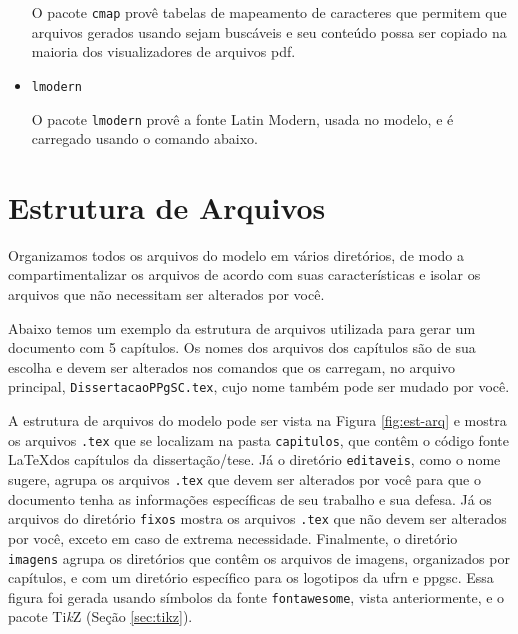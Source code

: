 \begin{itemize}
O pacote \texttt{cmap} provê tabelas de mapeamento de caracteres que permitem que arquivos gerados usando  sejam buscáveis e seu conteúdo possa ser copiado na maioria dos visualizadores de arquivos \gls{pdf}.


\item \texttt{lmodern}

O pacote \texttt{lmodern} provê a fonte Latin Modern, usada no modelo, e é carregado usando o comando abaixo.


\end{itemize}

\section{Estrutura de Arquivos}
Organizamos todos os arquivos do modelo em vários diretórios, de modo a compartimentalizar os arquivos de acordo com suas características e isolar os arquivos que não necessitam ser alterados por você.

Abaixo temos um exemplo da estrutura de arquivos utilizada para gerar um documento com 5 capítulos. Os nomes dos arquivos dos capítulos são de sua escolha e devem ser alterados nos comandos que os carregam, no arquivo principal, \texttt{DissertacaoPPgSC.tex}, cujo nome também pode ser mudado por você.

A estrutura de arquivos do modelo pode ser vista na Figura \ref{fig:est-arq} e mostra os arquivos \texttt{.tex} que se localizam na pasta \texttt{capitulos}, que contêm o código fonte \LaTeX dos capítulos da dissertação/tese. Já o diretório \texttt{editaveis}, como o nome sugere, agrupa os arquivos \texttt{.tex} que devem ser alterados por você para que o documento tenha as informações específicas de seu trabalho e sua defesa. Já os arquivos do diretório \texttt{fixos} mostra os arquivos \texttt{.tex} que não devem ser alterados por você, exceto em caso de extrema necessidade. Finalmente, o diretório  \texttt{imagens} agrupa os diretórios que contêm os arquivos de imagens, organizados por capítulos, e com um diretório específico para os logotipos da \gls{ufrn} e \gls{ppgsc}. Essa figura foi gerada usando símbolos da fonte \texttt{fontawesome}, vista anteriormente, e o pacote Ti\textit{k}Z (Seção \ref{sec:tikz}).

